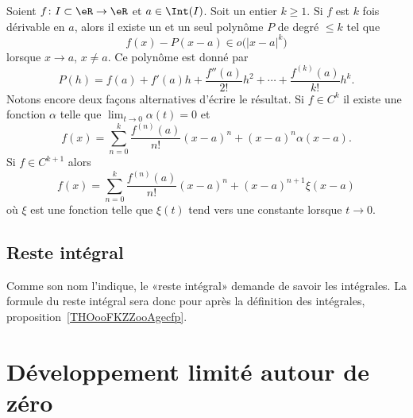 \begin{proposition}     \label{PropDevTaylorPol}
	Soient \( f\colon I\subset\eR\to \eR\) et \( a\in\Int(I)\). Soit un entier \( k\geq 1\). Si \( f\) est \( k\) fois dérivable en \( a\), alors il existe un et un seul polynôme \( P\) de degré \( \leq k\) tel que
	\begin{equation}
		f(x)-P(x-a)\in o\big( | x-a |^k \big)
	\end{equation}
	lorsque \( x\to a\), \( x\neq a\). Ce polynôme  est donné par
	\begin{equation}
		P(h)=f(a)+f'(a)h+\frac{ f''(a) }{ 2! }h^2+\cdots+\frac{ f^{(k)}(a) }{ k! }h^k.
	\end{equation}
	Notons encore deux façons alternatives d'écrire le résultat. Si \( f\in C^k\) il existe une fonction \( \alpha\) telle que \( \lim_{t\to 0} \alpha(t)=0\) et
	\begin{equation}
		f(x)=\sum_{n=0}^k\frac{ f^{(n)}(a) }{ n! }(x-a)^n+(x-a)^n\alpha(x-a).
	\end{equation}
	Si \( f\in C^{k+1}\) alors
	\begin{equation}        \label{EquQtpoN}
		f(x)=\sum_{n=0}^k\frac{ f^{(n)}(a) }{ n! }(x-a)^n+(x-a)^{n+1}\xi(x-a)
	\end{equation}
	où \( \xi\) est une fonction telle que \( \xi(t)\) tend vers une constante lorsque \( t\to 0\).
\end{proposition}


\subsection{Reste intégral}

Comme son nom l'indique, le «reste intégral» demande de savoir les intégrales. La formule du reste intégral sera donc pour après la définition des intégrales, proposition~\ref{THOooFKZZooAgecfp}.

\section{Développement limité autour de zéro}

